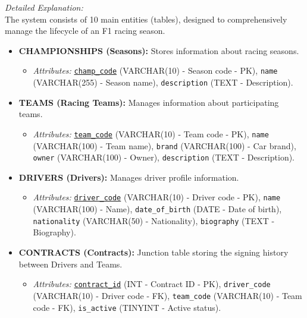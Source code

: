\documentclass[12pt, a4paper]{report}
\begin{document}
\begin{tcolorbox}[
    enhanced, breakable,    %
    colback=blue!5,         %
    colframe=blue!50!black, %
    boxrule=0.5pt,          %
    arc=2pt,                %
    left=10pt, right=10pt,  %
    top=8pt, bottom=8pt     %
]
{\large \textit{Detailed Explanation:}} \\ [12pt]


The system consists of 10 main entities (tables), designed to comprehensively manage the lifecycle of an F1 racing season.

\begin{itemize}[leftmargin=1.5cm]
    \item \textbf{CHAMPIONSHIPS (Seasons):} Stores information about racing seasons.
    \begin{itemize}
        \item \textit{Attributes:} \texttt{\underline{champ\_code}} (VARCHAR(10) - Season code - PK), \texttt{name} (VARCHAR(255) - Season name), \texttt{description} (TEXT - Description).
    \end{itemize}

    \item \textbf{TEAMS (Racing Teams):} Manages information about participating teams.
    \begin{itemize}
        \item \textit{Attributes:} \texttt{\underline{team\_code}} (VARCHAR(10) - Team code - PK), \texttt{name} (VARCHAR(100) - Team name), \texttt{brand} (VARCHAR(100) - Car brand), \texttt{owner} (VARCHAR(100) - Owner), \texttt{description} (TEXT - Description).
    \end{itemize}

    \item \textbf{DRIVERS (Drivers):} Manages driver profile information.
    \begin{itemize}
        \item \textit{Attributes:} \texttt{\underline{driver\_code}} (VARCHAR(10) - Driver code - PK), \texttt{name} (VARCHAR(100) - Name), \texttt{date\_of\_birth} (DATE - Date of birth), \texttt{nationality} (VARCHAR(50) - Nationality), \texttt{biography} (TEXT - Biography).
    \end{itemize}

    \item \textbf{CONTRACTS (Contracts):} Junction table storing the signing history between Drivers and Teams.
    \begin{itemize}
        \item \textit{Attributes:} \texttt{\underline{contract\_id}} (INT - Contract ID - PK), \texttt{driver\_code} (VARCHAR(10) - Driver code - FK), \texttt{team\_code} (VARCHAR(10) - Team code - FK), \texttt{is\_active} (TINYINT - Active status).
    \end{itemize}


\end{itemize}
\end{tcolorbox}
\end{document}
